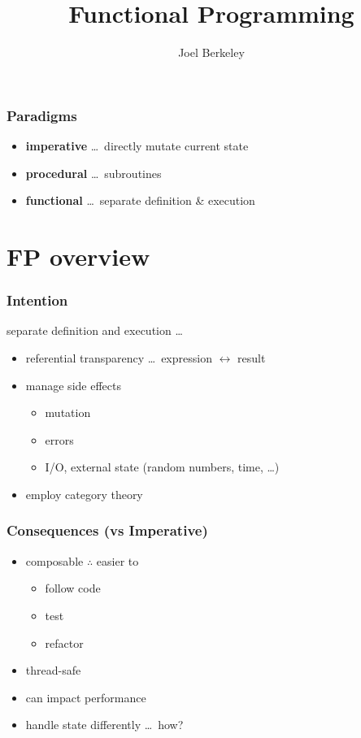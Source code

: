 \documentclass[xcolor={dvipsnames}]{beamer}
\author{Joel Berkeley}
\title{Functional Programming}
\date{}
\begin{document}
\begin{frame}
  \maketitle
\end{frame}

\begin{frame}
  \frametitle{Paradigms}
  \begin{itemize}
    \item<1-> \textbf{imperative} \ldots\ directly mutate current state
    \item<2-> \textbf{procedural} \ldots\ subroutines
    \item<3-> \textbf{functional} \ldots\ separate definition \& execution
  \end{itemize}
\end{frame}

\section{FP overview}

\begin{frame}[fragile]
  \frametitle{Intention}
   {
    separate definition and execution \ldots\
  }
  \only<2-> {
    \begin{itemize}
      \item<2-> referential transparency \ldots\ expression $\leftrightarrow$ result 
      \item<3-> manage side effects
        \begin{itemize}
          \item mutation
          \item errors
          \item I/O, external state (random numbers, time, \ldots)
        \end{itemize}
      \item<4-> employ category theory
    \end{itemize}
  }
\end{frame}

\begin{frame}
  \frametitle{Consequences (vs Imperative)}
  \begin{itemize}
    \item<1-> composable $\therefore$ easier to
      \begin{itemize}
        \item follow code
        \item test
        \item refactor
      \end{itemize}
    \item<2-> thread-safe
    \item<3-> can impact performance
    \item<4-> handle state differently \ldots\ how?
  \end{itemize}
\end{frame}
\end{document}
